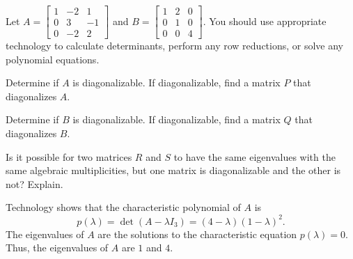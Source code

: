 \begin{example} Let $A = \left[ \begin{array}{crr} 1&-2&1 \\ 0&3&-1 \\ 0&-2&2 \end{array} \right]$ and $B = \left[ \begin{array}{ccc} 1&2&0 \\ 0&1&0 \\ 0&0&4 \end{array} \right]$. You should use appropriate technology to calculate determinants, perform any row reductions, or solve any polynomial equations. 
\ba
\item Determine if $A$ is diagonalizable. If diagonalizable, find a matrix $P$ that diagonalizes $A$.

\item Determine if $B$ is diagonalizable. If diagonalizable, find a matrix $Q$ that diagonalizes $B$.

\item Is it possible for two matrices $R$ and $S$ to have the same eigenvalues with the same algebraic multiplicities, but one matrix is diagonalizable and the other is not? Explain.

\ea

\ExampleSolution
\ba
\item Technology shows that the characteristic polynomial of $A$ is
\[p(\lambda) = \det(A - \lambda I_3) = (4-\lambda)(1-\lambda)^2.\]
The eigenvalues of $A$ are the solutions to the characteristic equation $p(\lambda) = 0$. Thus, the eigenvalues of $A$ are $1$ and $4$. 


\end{example}
